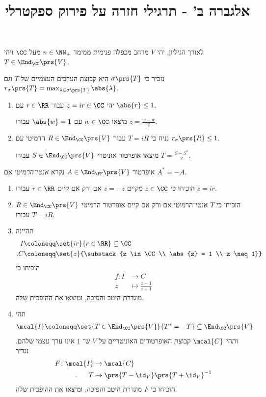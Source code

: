 \documentclass[a4paper,10pt,twoside,openany]{article}
\title{
אלגברה ב' - תרגילי חזרה על פירוק ספקטרלי
}
\date{}
\begin{document}
\maketitle

לאורך הגיליון, יהי
$V$
מרחב מכפלה פנימית ממימד
$n \in \NN_+$
מעל
$\CC$
ויהי
$T \in \End_\CC\prs{V}$.

נזכיר כי
$\sigma\prs{T}$
היא קבוצת הערכים העצמיים של
$T$
וגם
$r_\sigma\prs{T} = \max_{\lambda \in \sigma\prs{T}} \abs{\lambda}$.

\begin{exercise}
\begin{enumerate}
\item יהי
$z = i r \in \CC$
עבור
$r \in \RR$
עם
$\abs{r} \leq 1$.

מיצאו
$w \in \CC$
עם
$\abs{w} = 1$
עבורו
$z = \frac{w - \bar{w}}{2}$.

\item נניח כי
$T = i R$
עבור
$R \in \End_\CC\prs{V}$
הרמיטי עם
$r_\sigma\prs{R} \leq 1$.

מיצאו אופרטור אוניטרי
$S \in \End_\CC\prs{V}$
עבורו
$T = \frac{S - S^*}{2}$.
\end{enumerate}
\end{exercise}

\begin{exercise}
אופרטור
$A \in \End_\FF\prs{V}$
נקרא
\emph{אנטי־הרמיטי}
אם
$A^* = -A$.

\begin{enumerate}
\item
הוכיחו כי
$z \in \CC$
מקיים
$\bar{z} = -z$
אם ורק אם קיים
$r \in \RR$
עבורו
$z = ir$.

\item הוכיחו כי
$T$
אנטי־הרמיטי אם ורק אם קיים אופרטור הרמיטי
$R \in \End_\CC\prs{V}$
עבורו
$T = iR$.

\item תהיינה
\begin{align*}
I &\coloneqq \set{ir}{r \in \RR} \subseteq \CC \\
\text{.} C &\coloneqq \set{z}{\substack{z \in \CC \\ \abs{z} = 1 \\ z \neq 1}}
\end{align*}
הוכיחו כי
\begin{align*}
f \colon I &\to C \\
z &\mapsto \frac{z-1}{z+1}
\end{align*}
מוגדרת היטב והפיכה, ומיצאו את ההופכית שלה.

\item תהי
\begin{align*}
\mcal{I} \coloneqq \set{T \in \End_\CC\prs{V}}{T^* = -T} \subseteq \End_\CC\prs{V}
\end{align*}
ותהי
$\mcal{C}$
קבוצת האופרטורים האוניטריים על
$V$
ש־%
$1$
אינו ערך עצמי שלהם.
נגדיר
\begin{align*}
F \colon \mcal{I} &\to \mcal{C} \\
\text{.} \hphantom{lala} T &\mapsto \prs{T-\id_V}\prs{T + \id_V}^{-1}
\end{align*}
הוכיחו כי
$F$
מוגדרת היטב והפיכה, ומיצאו את ההופכית שלה.
\end{enumerate}
\end{exercise}
\end{document}
